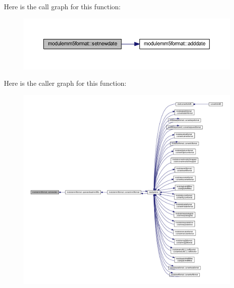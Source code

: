 Here is the call graph for this function\+:\nopagebreak
\begin{figure}[H]
\begin{center}
\leavevmode
\includegraphics[width=350pt]{namespacemodulemm5format_a87a63ca9f90961d4aa43cc6653ea5083_cgraph}
\end{center}
\end{figure}
Here is the caller graph for this function\+:\nopagebreak
\begin{figure}[H]
\begin{center}
\leavevmode
\includegraphics[width=350pt]{namespacemodulemm5format_a87a63ca9f90961d4aa43cc6653ea5083_icgraph}
\end{center}
\end{figure}
\mbox{\label{namespacemodulemm5format_afeeb0d8621c7c92d9be8dd4db8e1bf3d}} 
